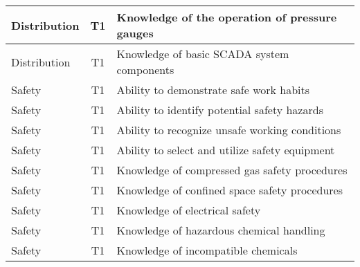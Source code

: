 \documentclass{article}
\begin{document}
\begin{table}[]
\begin{tabular}{|l|c|l|}
Distribution                           & T1             & Knowledge of the   operation of pressure gauges                                                                                   \\ \hline
Distribution                           & T1             & Knowledge of basic   SCADA system components                                                                                      \\ \hline
Safety                                 & T1             & Ability to   demonstrate safe work habits                                                                                         \\ \hline
Safety                                 & T1             & Ability to identify   potential safety hazards                                                                                    \\ \hline
Safety                                 & T1             & Ability to recognize   unsafe working conditions                                                                                  \\ \hline
Safety                                 & T1             & Ability to select and   utilize safety equipment                                                                                  \\ \hline
Safety                                 & T1             & Knowledge of   compressed gas safety procedures                                                                                   \\ \hline
Safety                                 & T1             & Knowledge of confined   space safety procedures                                                                                   \\ \hline
Safety                                 & T1             & Knowledge of   electrical safety                                                                                                  \\ \hline
Safety                                 & T1             & Knowledge of   hazardous chemical handling                                                                                        \\ \hline
Safety                                 & T1             & Knowledge of   incompatible chemicals                                                                                             \\ \hline

\end{tabular}
\end{table}
\end{document}
